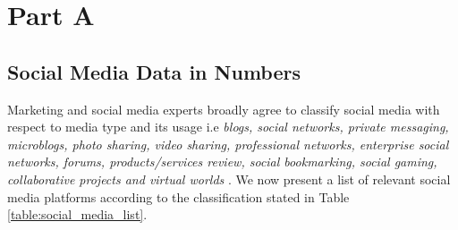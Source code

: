\section{Part A}
\label{part_a}
\subsection*{Social Media Data in Numbers}
Marketing and social media experts broadly agree to classify social media with respect to media type and its usage i.e {\em blogs, social networks, private messaging, microblogs,  photo sharing,  video sharing, professional networks,  enterprise social networks, forums, products/services review, social bookmarking, social gaming, collaborative projects  and virtual worlds} \cite{aichner2015measuring}. We now present a list of relevant social media platforms according to the classification stated in Table \ref{table:social_media_list}.

